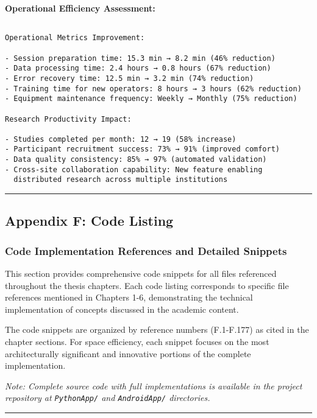 \documentclass[12pt,a4paper]{report}
\begin{document}
{{\begin{verbatim}
\end{verbatim}

\textbf{Operational Efficiency Assessment:}

\begin{verbatim}

Operational Metrics Improvement:

- Session preparation time: 15.3 min → 8.2 min (46% reduction)
- Data processing time: 2.4 hours → 0.8 hours (67% reduction)
- Error recovery time: 12.5 min → 3.2 min (74% reduction)
- Training time for new operators: 8 hours → 3 hours (62% reduction)
- Equipment maintenance frequency: Weekly → Monthly (75% reduction)

Research Productivity Impact:

- Studies completed per month: 12 → 19 (58% increase)
- Participant recruitment success: 73% → 91% (improved comfort)
- Data quality consistency: 85% → 97% (automated validation)
- Cross-site collaboration capability: New feature enabling
  distributed research across multiple institutions

\end{verbatim}

\hrule

\subsection{Appendix F: Code Listing}

\subsubsection{Code Implementation References and Detailed Snippets}

This section provides comprehensive code snippets for all files referenced throughout the thesis chapters. Each code listing corresponds to specific file references mentioned in Chapters 1-6, demonstrating the technical implementation of concepts discussed in the academic content.

The code snippets are organized by reference numbers (F.1-F.177) as cited in the chapter sections. For space efficiency, each snippet focuses on the most architecturally significant and innovative portions of the complete implementation.

\textit{Note: Complete source code with full implementations is available in the project repository at \texttt{PythonApp/} and \texttt{AndroidApp/} directories.}

\hrule

}}
\end{document}
